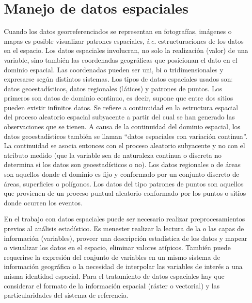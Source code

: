 \documentclass[11pt,b5paper,]{krantz}
\begin{document}
\hypertarget{manejo-de-datos-espaciales}{%
\chapter{Manejo de datos espaciales}\label{manejo-de-datos-espaciales}}

Cuando los datos georreferenciados se representan en fotografías, imágenes o mapas es posible visualizar patrones espaciales, \emph{i.e.} estructuraciones de los datos en el espacio. Los datos espaciales involucran, no solo la realización (valor) de una variable, sino también las coordenadas geográficas que posicionan el dato en el dominio espacial. Las coordenadas pueden ser uni, bi o tridimensionales y expresarse según distintos sistemas. Los tipos de datos espaciales usados son: datos geoestadísticos, datos regionales (látices) y patrones de puntos. Los primeros son datos de dominio continuo, es decir, supone que entre dos sitios pueden existir infinitos datos. Se refiere a continuidad en la estructura espacial del proceso aleatorio espacial subyacente a partir del cual se han generado las observaciones que se tienen. A causa de la continuidad del dominio espacial, los datos geoestadísticos también se llaman ``datos espaciales con variación continua''. La continuidad se asocia entonces con el proceso aleatorio subyacente y no con el atributo medido (que la variable sea de naturaleza continua o discreta no determina si los datos son geoestadísticos o no). Los datos regionales o de áreas son aquellos donde el dominio es fijo y conformado por un conjunto discreto de áreas, superficies o polígonos. Los datos del tipo patrones de puntos son aquellos que provienen de un proceso puntual aleatorio conformado por los puntos o sitios donde ocurren los eventos.

En el trabajo con datos espaciales puede ser necesario realizar preprocesamientos previos al análisis estadístico. Es menester realizar la lectura de la o las capas de información (variables), proveer una descripción estadística de los datos y mapear o visualizar los datos en el espacio, eliminar valores atípicos. También puede requerirse la expresión del conjunto de variables en un mismo sistema de información geográfica o la necesidad de interpolar las variables de interés a una misma identidad espacial. Para el tratamiento de datos espaciales hay que considerar el formato de la información espacial (ráster o vectorial) y las particularidades del sistema de referencia.
\end{document}
